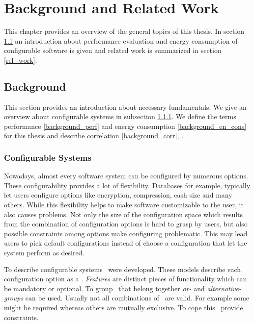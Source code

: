 \chapter{Background and Related Work}
\label{b_a_rel_work}

This chapter provides an overview of the general topics of this thesis. In section \ref{background} an introduction about performance evaluation and energy consumption of configurable software is given and related work is summarized in section \ref{rel_work}.

\section{Background}
\label{background}

This section provides an introduction about necessary fundamentals. We give an overview about configurable systems in subsection \ref{background_conf_sys}. We define the terms performance \ref{background_perf} and energy consumption \ref{background_en_cons} for this thesis and describe correlation \ref{background_corr}, .

\subsection{Configurable Systems}
\label{background_conf_sys}

Nowadays, almost every software system can be configured by numerous options. These configurability provides a lot of flexibility. Databases for example, typically let users configure options like encryption, compression, cash size and many others. While this flexibility helps to make software customizable to the user, it also causes problems. Not only the size of the configuration space which results from the combination of configuration options is hard to grasp by users, but also possible constraints among options make configuring problematic. This may lead users to pick default configurations instead of choose a configuration that let the system perform as desired.

To describe configurable systems \fmsit\ were developed. These models describe each configuration option as a \featureit. \textit{Features} are distinct pieces of functionality which can be mandatory or optional. To group \featuresit\ that belong together \textit{or-} and \textit{alternative-groups} can be used. Usually not all combinations of \featuresit\ are valid. For example some might be required whereas others are mutually exclusive. To cope this \fmsit\ provide constraints.


